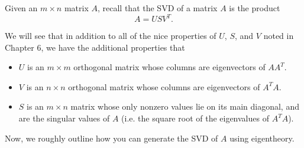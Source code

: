 \documentclass{ximera}
\begin{document}

 
Given an $m\times n$ matrix $A$, recall that the SVD of a matrix $A$ is the product
\[ A=US V^T.\]

We will see that in addition to all of the nice properties of $U$, $S$, and $V$ noted in Chapter 6, we have the additional properties that

\begin{itemize}
\item $U$ is an $m\times m$ orthogonal matrix whose columns are
eigenvectors of $AA^T$.
\item $V$ is an $n\times n$ orthogonal matrix whose columns are
eigenvectors of $A^TA$.
\item $S$ is an $m\times n$ matrix whose only nonzero values
lie on its main diagonal, and are the singular values of $A$ (i.e. the square root of the eigenvalues of $A^TA$).
\end{itemize}

Now, we roughly outline how you can generate the SVD of $A$ using eigentheory.
\end{document}
